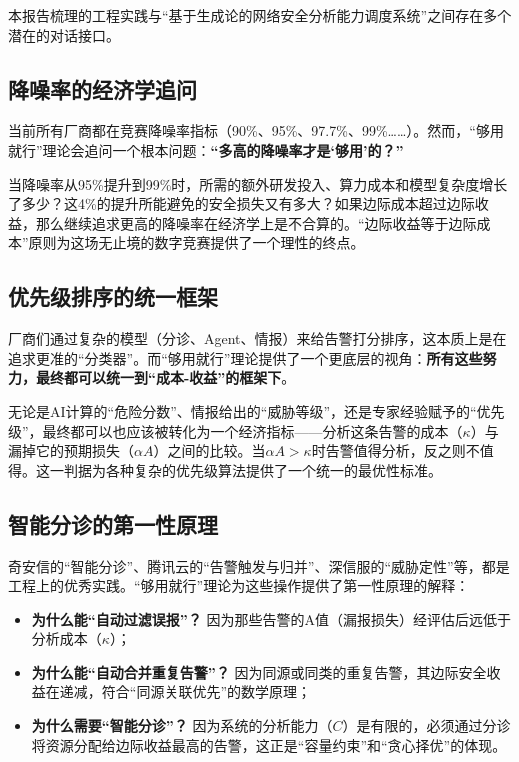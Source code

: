 \documentclass[11pt,a4paper]{article}
\begin{document}
本报告梳理的工程实践与“基于生成论的网络安全分析能力调度系统”之间存在多个潜在的对话接口。

\subsection{降噪率的经济学追问}

当前所有厂商都在竞赛降噪率指标（90\%、95\%、97.7\%、99\%……）。然而，“够用就行”理论会追问一个根本问题：\textbf{“多高的降噪率才是‘够用’的？”}

当降噪率从95\%提升到99\%时，所需的额外研发投入、算力成本和模型复杂度增长了多少？这4\%的提升所能避免的安全损失又有多大？如果边际成本超过边际收益，那么继续追求更高的降噪率在经济学上是不合算的。“边际收益等于边际成本”原则为这场无止境的数字竞赛提供了一个理性的终点。

\subsection{优先级排序的统一框架}

厂商们通过复杂的模型（分诊、Agent、情报）来给告警打分排序，这本质上是在追求更准的“分类器”。而“够用就行”理论提供了一个更底层的视角：\textbf{所有这些努力，最终都可以统一到“成本-收益”的框架下}。

无论是AI计算的“危险分数”、情报给出的“威胁等级”，还是专家经验赋予的“优先级”，最终都可以也应该被转化为一个经济指标——分析这条告警的成本（$\kappa$）与漏掉它的预期损失（$\alpha A$）之间的比较。当$\alpha A > \kappa$时告警值得分析，反之则不值得。这一判据为各种复杂的优先级算法提供了一个统一的最优性标准。

\subsection{智能分诊的第一性原理}

奇安信的“智能分诊”、腾讯云的“告警触发与归并”、深信服的“威胁定性”等，都是工程上的优秀实践。“够用就行”理论为这些操作提供了第一性原理的解释：
\begin{itemize}
    \item \textbf{为什么能“自动过滤误报”？} 因为那些告警的A值（漏报损失）经评估后远低于分析成本（$\kappa$）；
    \item \textbf{为什么能“自动合并重复告警”？} 因为同源或同类的重复告警，其边际安全收益在递减，符合“同源关联优先”的数学原理；
    \item \textbf{为什么需要“智能分诊”？} 因为系统的分析能力（$C$）是有限的，必须通过分诊将资源分配给边际收益最高的告警，这正是“容量约束”和“贪心择优”的体现。
\end{itemize}
\end{document}
